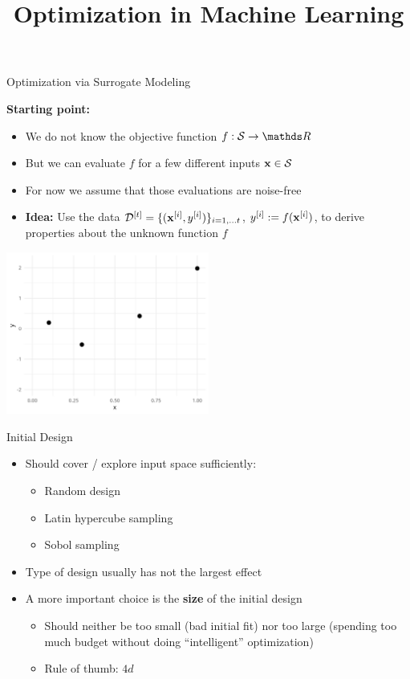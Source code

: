 \documentclass[11pt,compress,t,notes=noshow, xcolor=table]{beamer}
\title{Optimization in Machine Learning}
\date{}
\begin{document}

\begin{vbframe}{Optimization via Surrogate Modeling}

\textbf{Starting point:}
\begin{itemize}
\item We do not know the objective function $f: \mathcal{S} \to \R$
\item But we can evaluate $f$ for a few different inputs $\mathbf{x} \in \mathcal{S}$
\item For now we assume that those evaluations are noise-free

\item \textbf{Idea:}
  Use the data $\mathcal{D}^{[t]} = \{(\mathbf{x}^{[i]}, y^{[i]})\}_{i = 1, \ldots t}$, $y^{[i]} := f(\mathbf{x}^{[i]})$, to derive properties about the unknown function $f$
\end{itemize}

\begin{center}
  \includegraphics[width = 0.5\textwidth]{figure_man/loop_1.png}
\end{center}

\end{vbframe}

\begin{vbframe}{Initial Design}

\begin{itemize}
\item Should cover / explore input space sufficiently:
\begin{itemize}
  \item Random design
  \item Latin hypercube sampling
  \item Sobol sampling
\end{itemize}
\item Type of design usually has not the largest effect
\item A more important choice is the \textbf{size} of the initial design
\begin{itemize}
  \item Should neither be too small (bad initial fit) nor too large (spending too much budget without doing \enquote{intelligent} optimization)
  \item Rule of thumb: $4d$
\end{itemize}
\end{itemize}
\end{vbframe}
\end{document}
